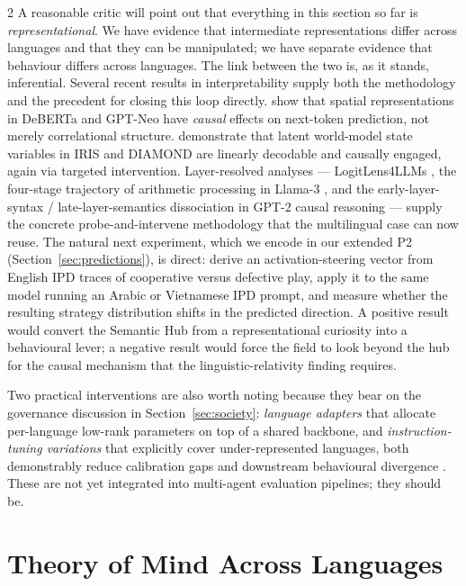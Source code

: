 \documentclass[openacc]{rsproca_new}
\begin{document}
\begin{multicols}{2}
A reasonable critic will point out that everything in this section so far is \emph{representational}. We have evidence that intermediate representations differ across languages and that they can be manipulated; we have separate evidence that behaviour differs across languages. The link between the two is, as it stands, inferential. Several recent results in interpretability supply both the methodology and the precedent for closing this loop directly. \citeauthor{chen2023spatialcausal} \cite{chen2023spatialcausal} show that spatial representations in DeBERTa and GPT-Neo have \emph{causal} effects on next-token prediction, not merely correlational structure. \citeauthor{zhang2026worldmodels} \cite{zhang2026worldmodels} demonstrate that latent world-model state variables in IRIS and DIAMOND are linearly decodable and causally engaged, again via targeted intervention. Layer-resolved analyses --- LogitLens4LLMs \cite{zhenyu2025logitlens}, the four-stage trajectory of arithmetic processing in Llama-3 \cite{yan2025arithmetic}, and the early-layer-syntax / late-layer-semantics dissociation in GPT-2 causal reasoning \cite{lee2024causalpaths} --- supply the concrete probe-and-intervene methodology that the multilingual case can now reuse. The natural next experiment, which we encode in our extended P2 (Section~\ref{sec:predictions}), is direct: derive an activation-steering vector from English IPD traces of cooperative versus defective play, apply it to the same model running an Arabic or Vietnamese IPD prompt, and measure whether the resulting strategy distribution shifts in the predicted direction. A positive result would convert the Semantic Hub from a representational curiosity into a behavioural lever; a negative result would force the field to look beyond the hub for the causal mechanism that the linguistic-relativity finding requires.

Two practical interventions are also worth noting because they bear on the governance discussion in Section~\ref{sec:society}: \emph{language adapters} that allocate per-language low-rank parameters on top of a shared backbone, and \emph{instruction-tuning variations} that explicitly cover under-represented languages, both demonstrably reduce calibration gaps and downstream behavioural divergence \cite{xue2021mt5, conneau2020xlmr}. These are not yet integrated into multi-agent evaluation pipelines; they should be.

\section{Theory of Mind Across Languages}
\label{sec:cognition}


\end{multicols}
\end{document}
